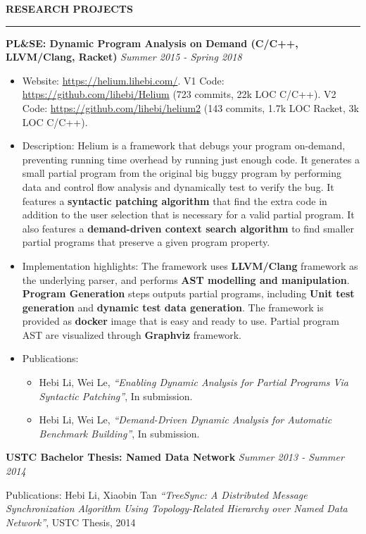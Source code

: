 \documentclass[10pt,letterpaper]{article}
\newenvironment{mysection}[1]{ %
  \medskip
  \MakeUppercase{\bf #1}
  \medskip
  \hrule
  \begin{list}{}{
      \setlength{\leftmargin}{1.5em}
    }
  \item[]
}{
  \end{list}
}
\begin{document}
\begin{mysection}{Research Projects}
  \textbf{PL\&SE: Dynamic Program Analysis on Demand (C/C++, LLVM/Clang,
    Racket)} \hfill \emph{Summer 2015 - Spring 2018}

  \begin{itemize}
  \item Website: \url{https://helium.lihebi.com/}. V1 Code:
    \url{https://github.com/lihebi/Helium} (723 commits, 22k LOC
    C/C++). V2 Code: \url{https://github.com/lihebi/helium2} (143
    commits, 1.7k LOC Racket, 3k LOC C/C++).
  \item Description: Helium is a framework that debugs your program
    on-demand, preventing running time overhead by running just enough
    code. It generates a small partial program from the original big
    buggy program by performing data and control flow analysis and
    dynamically test to verify the bug.  It features a
    \textbf{syntactic patching algorithm} that find the extra code in
    addition to the user selection that is necessary for a valid
    partial program. It also features a \textbf{demand-driven context
      search algorithm} to find smaller partial programs that preserve
    a given program property.
  \item Implementation highlights: The framework uses
    \textbf{LLVM/Clang} framework as the underlying parser, and
    performs \textbf{AST modelling and manipulation}. \textbf{Program
      Generation} steps outputs partial programs, including
    \textbf{Unit test generation} and \textbf{dynamic test data
      generation}. The framework is provided as \textbf{docker} image
    that is easy and ready to use. Partial program AST are visualized
    through \textbf{Graphviz} framework.
  \item Publications:
    \begin{itemize}
    \item Hebi Li, Wei Le, \textit{``Enabling Dynamic Analysis for
      Partial Programs Via Syntactic Patching''}, In submission.
    \item Hebi Li, Wei Le, \textit{``Demand-Driven Dynamic Analysis
      for Automatic Benchmark Building''}, In submission.
    \end{itemize}
  \end{itemize}

  \textbf{USTC Bachelor Thesis: Named Data Network} \hfill
  \emph{Summer 2013 - Summer 2014}

  Publications: Hebi Li, Xiaobin Tan \textit{``TreeSync: A Distributed
    Message Synchronization Algorithm Using Topology-Related Hierarchy
    over Named Data Network''}, USTC Thesis, 2014
\end{mysection}
\end{document}
